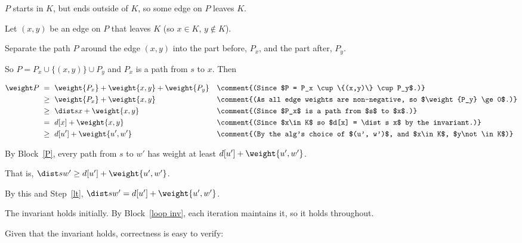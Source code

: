 \begin{longFormProof}
\begin{block}
\begin{block}
      \step $P$ starts in $K$, but ends outside of $K$, so some edge on $P$ leaves $K$.

      \step Let $(x,y)$ be an edge on $P$ that leaves $K$ (so $x\in K$, $y\not\in K$).

      \step Separate the path $P$ around the edge $(x,y)$ into
      the part before, $P_x$, and the part after, $P_y$.

      \step So $P = P_x \cup \{(x,y)\} \cup P_y$ and $P_x$ is a path from $s$ to $x$. Then

      \begin{align*}
        \weight P~
        &=~ \weight {P_x} + \weight {x,y} + \weight {P_y}
        && \comment{(Since $P = P_x \cup \{(x,y)\} \cup P_y$.)}
        \\
        &\ge~ \weight {P_x} + \weight {x,y}
        && \comment{(As all edge weights are non-negative, so $\weight {P_y} \ge 0$.)}
        \\
        &\ge~ \dist s x + \weight {x,y}
        && \comment{(Since $P_x$ is a path from $s$ to $x$.)}
        \\
        &=~ d[x] + \weight {x,y}
        && \comment{(Since $x\in K$ so $d[x] = \dist s x$ by the invariant.)}
        \\
        &\ge~ d[u'] + \weight {u',w'}
        && \comment{(By the alg's choice of $(u', w')$, and $x\in K$, $y\not\in K$)}
      \end{align*}
    \end{block}

    \step By Block~\ref{P}, every path from $s$ to $w'$
    has weight at least $d[u'] + \weight {u',w'}$.

    \step That is, $\dist s {w'} \ge d[u'] + \weight {u',w'}$.

    \smallskip

    \step By this and Step~\ref{lt}, $\dist s {w'} = d[u'] + \weight {u',w'}$.

  \end{block}

  \step The invariant holds initially. By Block~\ref{loop inv}, each iteration maintains it, so it holds throughout.

\end{longFormProof}

\continued

Given that the invariant holds, correctness is easy to verify:  

